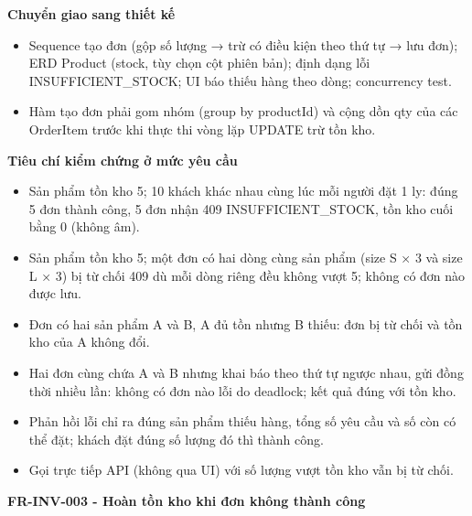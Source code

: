 \documentclass[11pt,a4paper,oneside]{report}
\begin{document}
\textbf{Chuyển giao sang thiết kế}

\begin{itemize}
\item
  Sequence tạo đơn (gộp số lượng → trừ có điều kiện theo thứ tự → lưu đơn); ERD Product (stock, tùy chọn cột phiên bản); định dạng lỗi INSUFFICIENT\_STOCK; UI báo thiếu hàng theo dòng; concurrency test.
\item
  Hàm tạo đơn phải gom nhóm (group by productId) và cộng dồn qty của các OrderItem trước khi thực thi vòng lặp UPDATE trừ tồn kho.
\end{itemize}

\textbf{Tiêu chí kiểm chứng ở mức yêu cầu}

\begin{itemize}
\item
  Sản phẩm tồn kho 5; 10 khách khác nhau cùng lúc mỗi người đặt 1 ly: đúng 5 đơn thành công, 5 đơn nhận 409 INSUFFICIENT\_STOCK, tồn kho cuối bằng 0 (không âm).
\item
  Sản phẩm tồn kho 5; một đơn có hai dòng cùng sản phẩm (size S × 3 và size L × 3) bị từ chối 409 dù mỗi dòng riêng đều không vượt 5; không có đơn nào được lưu.
\item
  Đơn có hai sản phẩm A và B, A đủ tồn nhưng B thiếu: đơn bị từ chối và tồn kho của A không đổi.
\item
  Hai đơn cùng chứa A và B nhưng khai báo theo thứ tự ngược nhau, gửi đồng thời nhiều lần: không có đơn nào lỗi do deadlock; kết quả đúng với tồn kho.
\item
  Phản hồi lỗi chỉ ra đúng sản phẩm thiếu hàng, tổng số yêu cầu và số còn có thể đặt; khách đặt đúng số lượng đó thì thành công.
\item
  Gọi trực tiếp API (không qua UI) với số lượng vượt tồn kho vẫn bị từ chối.
\end{itemize}

\textbf{FR-INV-003 - Hoàn tồn kho khi đơn không thành công}
\end{document}
